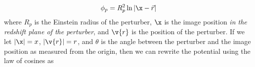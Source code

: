 \begin{equation}
\phi_p = R_p^2 \ln \left| \x - \vec{r} \right| 
\end{equation}
where $R_p$ is the Einstein radius of the perturber, $\x$ is the image position \textit{in the redshift plane of the perturber}, and $\v{r}$ is the position of the perturber. If we let $|\x| = x$, $|\v{r}| = r$, and $\theta$ is the angle between the perturber and the image position as measured from the origin, then we can rewrite the potential using the law of cosines as
  
  
  